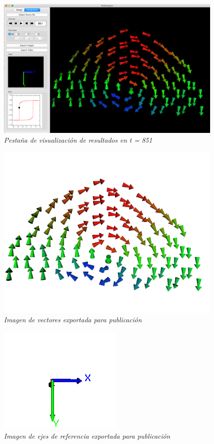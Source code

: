 \begin{figure}[H]
  \centering
  \includegraphics[scale=.3]{images/softwareVisualizacionPantalla}
  \caption{\em Pestaña de visualización de resultados en t = 851}
\end{figure}


\begin{figure}[H]
  \centering
  \includegraphics[scale=.3]{images/softwareVisualizacionVectors}
  \caption{\em Imagen de vectores exportada para publicación}
  \label{fig:vectors}
\end{figure}


\begin{figure}[H]
  \centering
  \includegraphics[scale=.6]{images/softwareVisualizacionAxes}
  \caption{\em Imagen de ejes de referencia exportada para publicación}
\end{figure}


